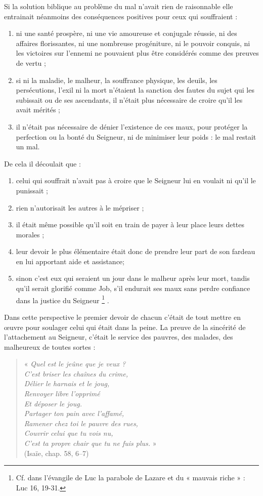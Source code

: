  Si la solution biblique au problème du mal n'avait rien de raisonnable elle entrainait néanmoins des conséquences positives pour ceux qui souffraient :
\begin{enumerate}
\item ni une santé prospère, ni une vie amoureuse et conjugale réussie, ni des affaires florissantes, ni une nombreuse progéniture, ni le pouvoir conquis, ni les victoires sur l'ennemi ne pouvaient plus être considérés comme des preuves de vertu ;
\item si ni la maladie, le malheur, la souffrance physique, les deuils, les persécutions, l'exil ni la mort n'étaient la sanction des fautes du sujet qui les subissait ou de ses ascendants, il n'était plus nécessaire de croire qu'il les avait mérités ;
\item il n'était pas nécessaire de dénier l'existence de ces maux, pour protéger la perfection ou la bonté du Seigneur, ni de minimiser leur poids : le mal restait un mal.
\end{enumerate}

 De cela il découlait que :
\begin{enumerate}
\item celui qui souffrait n'avait pas à croire que le Seigneur lui en voulait ni qu'il le punissait ;
\item rien n'autorisait les autres à le mépriser ;
\item il était même possible qu'il soit en train de payer à leur place leurs dettes morales ;
\item leur devoir le plus élémentaire était donc de prendre leur part de son fardeau en lui apportant aide et assistance;
\item sinon c'est eux qui seraient un jour dans le malheur après leur mort, tandis qu'il serait glorifié comme Job, s'il endurait ses maux sans perdre confiance dans la justice du Seigneur%
\footnote{Cf. dans l'évangile de Luc la parabole de Lazare et du « mauvais riche » : Luc 16, 19-31.}%
.
\end{enumerate}

 Dans cette perspective le premier devoir de chacun c'était de tout mettre en œuvre pour soulager celui qui était dans la peine. La preuve de la sincérité de l'attachement au Seigneur, c'était le service des pauvres, des malades, des malheureux de toutes sortes :

\begin{verse}
 « \emph{Quel est le jeûne que je veux ? \\
 C'est briser les chaînes du crime, \\
 Délier le harnais et le joug, \\
 Renvoyer libre l'opprimé \\
 Et déposer le joug. \\
 Partager ton pain avec l'affamé, \\
 Ramener chez toi le pauvre des rues, \\
 Couvrir celui que tu vois nu, \\
 C'est ta propre chair que tu ne fuis plus.} » \\
 (Isaïe, chap. 58, 6--7)
\end{verse}

